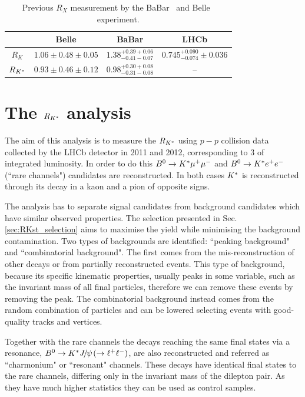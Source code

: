 \begin{center}
\begin{table}[h!]
\label{expstatus}
\centering
\begin{tabular}{c|c|c|c}
 	& Belle 			& BaBar 		& LHCb \\
 \hline
$R_K$			& $1.06 \pm 0.48 \pm 0.05$	& $1.38^{+0.39+0.06}_{-0.41-0.07}$ & $0.745^{+0.090}_{-0.074} \pm 0.036$\\
$R_{{{K}^*}}$	& $0.93 \pm 0.46 \pm 0.12$	& $0.98^{+0.30+0.08}_{-0.31-0.08}$ & --\\
\end{tabular}
\caption{Previous $R_X$ measurement by the BaBar~\cite{Lees:2012tva} and Belle~\cite{Wei:2009zv} experiment.}
\end{table}
\end{center}

\section{The $R_{{{K}^*}}$ analysis}

The aim of this analysis is to measure the $R_{{{K}^*}}$ using $p-p$ collision data collected by the LHCb
detector in 2011 and 2012, corresponding to 3 \invfb of integrated luminosity.
In order to do this ${{B}^0} \rightarrow {\ensuremath{{K}^*}}{\ensuremath{\mu^+\mu^-}}$ and ${{B}^0} \rightarrow {\ensuremath{{K}^*}}e^+ e^-$ (``rare channels") candidates are
reconstructed. In both cases ${{K}^*}$ is reconstructed through its decay in a kaon and a pion of opposite signs.

The analysis has to separate signal candidates from background candidates which have similar observed properties. 
The selection presented in Sec. \ref{sec:RKst_selection} aims to maximise the yield while minimising
the background contamination. Two types of backgrounds are identified: ``peaking background" and ``combinatorial background". 
The first comes from the mis-reconstruction of other decays or from partially reconstructed events. This type 
of background,  because its specific kinematic properties, usually peaks in some variable, such as the invariant
mass of all final particles, therefore we can remove these events by removing the peak. The combinatorial background 
instead comes from the random combination of particles and can be lowered selecting events with good-quality tracks 
and vertices.

Together with the rare channels the decays reaching the same final states via a \jpsi
resonance, $\Bz\to\Kstar\jpsi(\to\ell^+\ell^-)$, are also reconstructed and referred as
``charmonium" or ``resonant" channels. These decays have identical final states to the rare channels, differing
only in the invariant mass of the dilepton pair. As they have much higher statistics they can be used as
control samples. 


